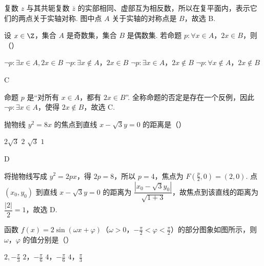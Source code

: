 \begin{solution}
复数 \(z\) 与其共轭复数 \(\overline z\) 的实部相同、虚部互为相反数，所以在复平面内，表示它们的两点关于实轴对称. 图中点 \(A\) 关于实轴的对称点是 \(B\)，故选 B.
\end{solution}

\begin{problem}
设 \(x \in \Z\)，集合 \(A\) 是奇数集，集合 \(B\) 是偶数集. 若命题 \(p: \forall x \in A\)，\(2x \in B\)，则（\quad）

\choices
    {\(\neg p: \exists x \in A, 2x \in B\)}
    {\(\neg p: \exists x \notin A\)，\(2x \in B\)}
    {\(\neg p: \exists x \in A\)，\(2x \notin B\)}
    {\(\neg p: \forall x \notin A\)，\(2x \notin B\)}
\end{problem}

\begin{answer}
C
\end{answer}

\begin{solution}
命题 \(p\) 是“对所有 \(x\in A\)，都有 \(2x\in B\)”. 全称命题的否定是存在一个反例，因此
\(\neg p: \exists x\in A\)，使得 \(2x\notin B\)，故选 C.
\end{solution}

\begin{problem}
抛物线 \(y^{2}=8x\) 的焦点到直线 \(x-\sqrt{3}y=0\) 的距离是（\quad）

\choices
    {\(2\sqrt{3}\)}
    {\(2\)}
    {\(\sqrt{3}\)}
    {\(1\)}
\end{problem}

\begin{answer}
D
\end{answer}

\begin{solution}
将抛物线写成 \(y^{2}=2px\)，得 \(2p=8\)，所以 \(p=4\)，焦点为 \(F\left(\frac p2,0\right)=(2,0)\). 点 \((x_0,y_0)\) 到直线 \(x-\sqrt{3}y=0\) 的距离为
\(\dfrac{|x_0-\sqrt{3}y_0|}{\sqrt{1+3}}\)，故焦点到该直线的距离为 \(\dfrac{|2|}{2}=1\)，故选 D.
\end{solution}

\begin{problem}
函数 \(f(x)=2\sin\left(\omega x+\varphi\right)\)（\(\omega>0\)，\(-\frac{\pi}{2}<\varphi<\frac{\pi}{2}\)）的部分图象如图所示，则 \(\omega\)，\(\varphi\) 的值分别是（\quad）


\choices
    {\(2, -\frac{\pi}{3}\)}
    {\(2\)，\(-\frac{\pi}{6}\)}
    {\(4\)，\(-\frac{\pi}{6}\)}
    {\(4\)，\(\frac{\pi}{3}\)}
\end{problem}

